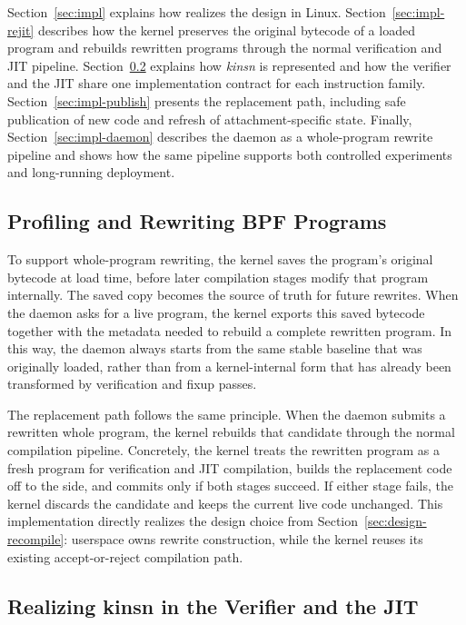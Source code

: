 Section~\ref{sec:impl} explains how \tool realizes the design in Linux. Section~\ref{sec:impl-rejit} describes how the kernel preserves the original bytecode of a loaded program and rebuilds rewritten programs through the normal verification and JIT pipeline. Section~\ref{sec:impl-kinsn} explains how \emph{kinsn} is represented and how the verifier and the JIT share one implementation contract for each instruction family. Section~\ref{sec:impl-publish} presents the replacement path, including safe publication of new code and refresh of attachment-specific state. Finally, Section~\ref{sec:impl-daemon} describes the daemon as a whole-program rewrite pipeline and shows how the same pipeline supports both controlled experiments and long-running deployment.

\subsection{Profiling and Rewriting BPF Programs}
\label{subsec:impl-rejit}

To support whole-program rewriting, the kernel saves the program's original bytecode at load time, before later compilation stages modify that program internally. The saved copy becomes the source of truth for future rewrites. When the daemon asks for a live program, the kernel exports this saved bytecode together with the metadata needed to rebuild a complete rewritten program. In this way, the daemon always starts from the same stable baseline that was originally loaded, rather than from a kernel-internal form that has already been transformed by verification and fixup passes.

The replacement path follows the same principle. When the daemon submits a rewritten whole program, the kernel rebuilds that candidate through the normal compilation pipeline. Concretely, the kernel treats the rewritten program as a fresh program for verification and JIT compilation, builds the replacement code off to the side, and commits only if both stages succeed. If either stage fails, the kernel discards the candidate and keeps the current live code unchanged. This implementation directly realizes the design choice from Section~\ref{sec:design-recompile}: userspace owns rewrite construction, while the kernel reuses its existing accept-or-reject compilation path.

\subsection{Realizing kinsn in the Verifier and the JIT}
\label{sec:impl-kinsn}

